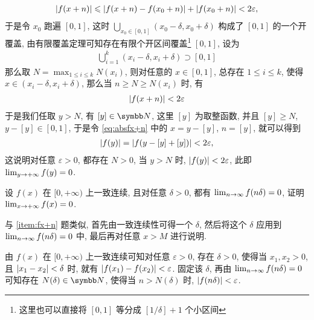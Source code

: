 \begin{exercise}[series=exer]
\begin{answer}
        \begin{align*}
            \abs{f(x + n)} \leqslant \abs{f(x + n) - f(x_{0} + n)} + \abs{f(x_{0} + n)} < 2 \varepsilon,
        \end{align*}
        于是令 $ x_{0} $ 跑遍 $ [0, 1] $, 这时 $ \bigcup_{x_{0} \in [0, 1]} (x_{0} - \delta, x_{0} + \delta) $ 构成了 $ [0, 1] $ 的一个开覆盖, 由有限覆盖定理可知存在有限个开区间覆盖\footnote{这里也可以直接将 $ [0, 1] $ 等分成 $ [1/\delta] + 1 $ 个小区间} $ [0, 1] $, 设为
        \begin{align*}
            \bigcup_{i = 1}^{k} (x_{i} - \delta, x_{i} + \delta) \supset [0, 1]
        \end{align*}
        那么取 $ N = \max_{1 \le i \le k} N(x_{i}) $, 则对任意的 $ x \in [0, 1] $, 总存在 $ 1 \le i \le k $, 使得 $ x \in (x_{i} - \delta, x_{i} + \delta) $, 那么当 $ n \ge N \ge N(x_{i}) $ 时, 有
        \begin{align}\label{eq:absfx+n}
            \abs{f(x + n)} < 2\varepsilon
        \end{align}
        于是我们任取 $ y > N $, 有 $ [y] \in \N $, 这里 $ [y] $ 为取整函数, 并且 $ [y] \ge N $, $ y - [y] \in [0, 1] $, 于是令 \eqref{eq:absfx+n} 中的 $ x = y - [y] $, $ n = [y] $, 就可以得到
        \begin{align*}
            \abs{f(y)} = \abs{f(y - [y] + [y])} < 2\varepsilon, 
        \end{align*}
        这说明对任意 $ \varepsilon > 0 $, 都存在 $ N > 0 $, 当 $ y > N $ 时, $ \abs{f(y)} < 2\varepsilon $, 此即 $ \lim_{y \to +\infty}f(y) = 0 $. 
    \end{answer}
    \item 设 $ f(x) $ 在 $ [0, +\infty) $ 上一致连续, 且对任意 $ \delta > 0 $, 都有 $ \lim_{n \to \infty} f(n\delta) = 0 $, 证明 $ \lim_{x \to +\infty} f(x) = 0 $. 
    \begin{hint}
        与 \ref{item:fx+n} 题类似, 首先由一致连续性可得一个 $ \delta $, 然后将这个 $ \delta $ 应用到 $ \lim_{n \to \infty} f(n\delta) = 0 $ 中, 最后再对任意 $ x > M $ 进行说明.
    \end{hint}
    \begin{answer}
        由 $ f(x) $ 在 $ [0, +\infty) $ 上一致连续可知对任意 $ \varepsilon > 0 $, 存在 $ \delta > 0 $, 使得当 $ x_{1}, x_{2} > 0 $, 且 $ \abs{x_{1} - x_{2}} < \delta $ 时, 就有 $ \abs{f(x_{1}) - f(x_{2})} < \varepsilon $. 固定该 $ \delta $, 再由 $ \lim_{n \to \infty}f(n\delta) = 0 $ 可知存在 $ N(\delta) \in \N $, 使得当 $ n > N(\delta) $ 时, $ \abs{f(n\delta)} < \varepsilon $. 
        

\end{answer}
\end{exercise}
